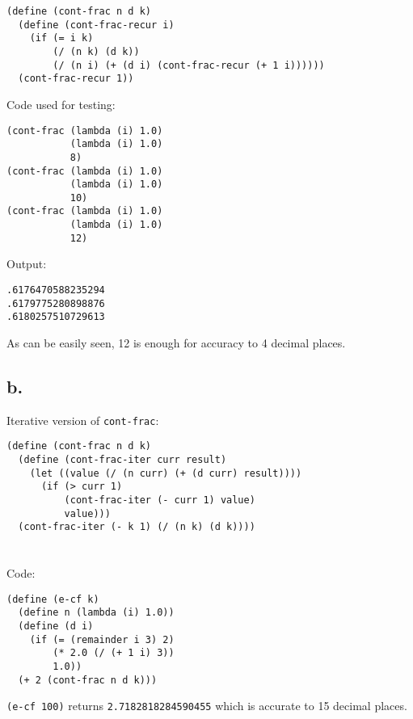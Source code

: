\documentclass[../main.tex]{subfiles}
\begin{document}
\begin{lstlisting}
(define (cont-frac n d k)
  (define (cont-frac-recur i)
    (if (= i k)
        (/ (n k) (d k))
        (/ (n i) (+ (d i) (cont-frac-recur (+ 1 i))))))
  (cont-frac-recur 1))
\end{lstlisting}

Code used for testing:

\begin{lstlisting}
(cont-frac (lambda (i) 1.0)
           (lambda (i) 1.0)
           8)
(cont-frac (lambda (i) 1.0)
           (lambda (i) 1.0)
           10)
(cont-frac (lambda (i) 1.0)
           (lambda (i) 1.0)
           12)
\end{lstlisting}

Output:

\begin{lstlisting}
.6176470588235294
.6179775280898876
.6180257510729613
\end{lstlisting}

As can be easily seen, 12 is enough for accuracy to 4 decimal places.

\subsection*{b.}

Iterative version of \lstinline{cont-frac}:

\begin{lstlisting}
(define (cont-frac n d k)
  (define (cont-frac-iter curr result)
    (let ((value (/ (n curr) (+ (d curr) result))))
      (if (> curr 1)
          (cont-frac-iter (- curr 1) value)
          value)))
  (cont-frac-iter (- k 1) (/ (n k) (d k))))
\end{lstlisting}


\section{}

Code:

\begin{lstlisting}
(define (e-cf k)
  (define n (lambda (i) 1.0))
  (define (d i)
    (if (= (remainder i 3) 2)
        (* 2.0 (/ (+ 1 i) 3))
        1.0))
  (+ 2 (cont-frac n d k)))
\end{lstlisting}

\lstinline{(e-cf 100)} returns \lstinline{2.7182818284590455} which is
 accurate to 15 decimal places.
\end{document}
